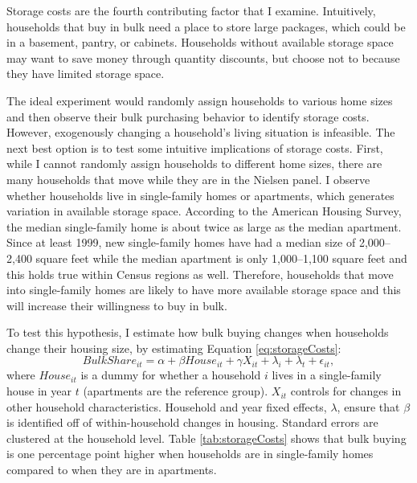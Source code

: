 \documentclass[AER]{AEA_mal}
\begin{document}
Storage costs are the fourth contributing factor that I examine. Intuitively, households that buy in bulk need a place to store large packages, which could be in a basement, pantry, or cabinets. Households without available storage space may want to save money through quantity discounts, but choose not to because they have limited storage space.

The ideal experiment would randomly assign households to various home sizes and then observe their bulk purchasing behavior to identify storage costs. However, exogenously changing a household's living situation is infeasible. The next best option is to test some intuitive implications of storage costs. First, while I cannot randomly assign households to different home sizes, there are many households that move while they are in the Nielsen panel. I observe whether households live in single-family homes or apartments, which generates variation in available storage space. According to the American Housing Survey, the median single-family home is about twice as large as the median apartment. Since at least 1999, new single-family homes have had a median size of 2,000--2,400 square feet while the median apartment is only 1,000--1,100 square feet and this holds true within Census regions as well. Therefore, households that move into single-family homes are likely to have more available storage space and this will increase their willingness to buy in bulk.

To test this hypothesis, I estimate how bulk buying changes when households change their housing size, by estimating Equation \ref{eq:storageCosts}:
\begin{equation}
\label{eq:storageCosts}
BulkShare_{it} = \alpha + \beta House_{it} + \gamma X_{it} + \lambda_i + \lambda_t + \epsilon_{it},
\end{equation}
where $House_{it}$ is a dummy for whether a household $i$ lives in a single-family house in year $t$ (apartments are the reference group). $X_{it}$ controls for changes in other household characteristics. Household and year fixed effects, $\lambda$, ensure that $\beta$ is identified off of within-household changes in housing. Standard errors are clustered at the household level. Table \ref{tab:storageCosts} shows that bulk buying is one percentage point higher when households are in single-family homes compared to when they are in apartments.


\end{document}
